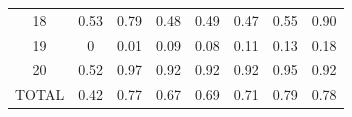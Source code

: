 \documentclass[twoside,11pt]{article}
\begin{document}
\begin{table}[H]
{\begin{tabular}{cccccccc}
\multicolumn{1}{|c|}{18}    & \multicolumn{1}{c|}{0.53}                                                           & \multicolumn{1}{c|}{\cellcolor[HTML]{ECF4FF}0.79}                                                             & \multicolumn{1}{c|}{0.48}                                                                               & \multicolumn{1}{c|}{0.49}                                                                               & \multicolumn{1}{c|}{0.47}                                                                               & \multicolumn{1}{c|}{0.55}                                                                                  & \multicolumn{1}{c|}{\cellcolor[HTML]{FFCCC9}0.90}                                                          \\ \cline{1-1}
\multicolumn{1}{|c|}{19}    & \multicolumn{1}{c|}{0}                                                              & \multicolumn{1}{c|}{0.01}                                                                                     & \multicolumn{1}{c|}{0.09}                                                                               & \multicolumn{1}{c|}{0.08}                                                                               & \multicolumn{1}{c|}{0.11}                                                                               & \multicolumn{1}{c|}{\cellcolor[HTML]{ECF4FF}0.13}                                                          & \multicolumn{1}{c|}{\cellcolor[HTML]{FFCCC9}0.18}                                                          \\ \cline{1-1}
\multicolumn{1}{|c|}{20}    & \multicolumn{1}{c|}{0.52}                                                           & \multicolumn{1}{c|}{\cellcolor[HTML]{FFCCC9}0.97}                                                             & \multicolumn{1}{c|}{0.92}                                                                               & \multicolumn{1}{c|}{0.92}                                                                               & \multicolumn{1}{c|}{0.92}                                                                               & \multicolumn{1}{c|}{\cellcolor[HTML]{ECF4FF}0.95}                                                          & \multicolumn{1}{c|}{0.92}                                                                                  \\ \hline
\multicolumn{1}{|c|}{TOTAL} & \multicolumn{1}{c|}{0.42}                                                           & \multicolumn{1}{c|}{0.77}                                                                                     & \multicolumn{1}{c|}{0.67}                                                                               & \multicolumn{1}{c|}{0.69}                                                                               & \multicolumn{1}{c|}{0.71}                                                                               & \multicolumn{1}{c|}{\cellcolor[HTML]{FFCCC9}0.79}                                                          & \multicolumn{1}{c|}{\cellcolor[HTML]{ECF4FF}0.78}                                                          \\ \hline

\end{tabular}}
\end{table}
\end{document}
